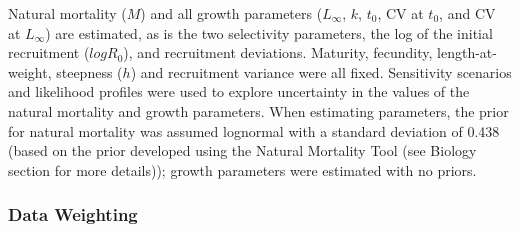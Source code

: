 \documentclass[11pt,
  english,
  a4paper,
]{article}
\begin{document}

Natural mortality ({\(M\)\leavevmode\tagmcend\tagstructend}) and all growth parameters ({\(L_{\infty}\)\leavevmode\tagmcend\tagstructend}, {\(k\)\leavevmode\tagmcend\tagstructend}, {\(t_0\)\leavevmode\tagmcend\tagstructend}, CV at {\(t_0\)\leavevmode\tagmcend\tagstructend}, and CV at {\(L_{\infty}\)\leavevmode\tagmcend\tagstructend}) are estimated, as is the two selectivity parameters, the log of the initial recruitment ({\(logR_0\)\leavevmode\tagmcend\tagstructend}), and recruitment deviations. Maturity, fecundity, length-at-weight, steepness ({\(h\)\leavevmode\tagmcend\tagstructend}) and recruitment variance were all fixed. Sensitivity scenarios and likelihood profiles were used to explore uncertainty in the values of the natural mortality and growth parameters. When estimating parameters, the prior for natural mortality was assumed lognormal with a standard deviation of 0.438 (based on the prior developed using the Natural Mortality Tool (see Biology section for more details)); growth parameters were estimated with no priors.

\leavevmode\tagmcend\tagstructend\par


\hypertarget{data-weighting}{%
\subsubsection{Data Weighting}\label{data-weighting}}

\leavevmode\tagmcend\tagstructend

\end{document}
